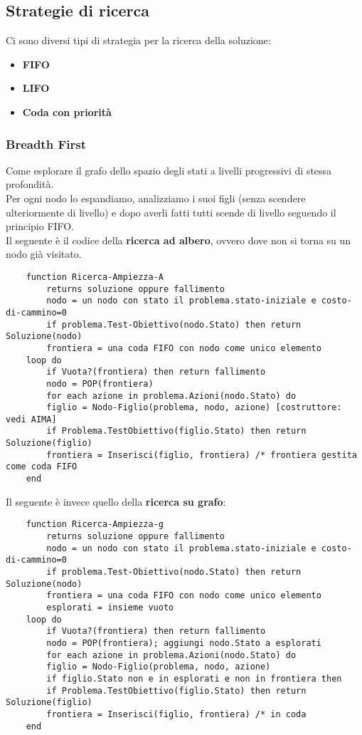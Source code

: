 \subsection{Strategie di ricerca}
Ci sono diversi tipi di strategia per la ricerca della soluzione:
\begin{itemize}
	\item \textbf{FIFO}
	\item \textbf{LIFO}
	\item \textbf{Coda con priorità}
\end{itemize}


\subsubsection{Breadth First}
Come esplorare il grafo dello spazio degli stati a livelli progressivi di stessa profondità.\\
Per ogni nodo lo espandiamo, analizziamo i suoi figli (senza scendere ulteriormente di livello) e dopo averli fatti tutti scende di livello seguendo il principio FIFO.\\
Il seguente è il codice della \textbf{ricerca ad albero}, ovvero dove non si torna su un nodo già visitato.

\begin{lstlisting}
	function Ricerca-Ampiezza-A
		returns soluzione oppure fallimento
		nodo = un nodo con stato il problema.stato-iniziale e costo-di-cammino=0
		if problema.Test-Obiettivo(nodo.Stato) then return Soluzione(nodo)
		frontiera = una coda FIFO con nodo come unico elemento
	loop do
		if Vuota?(frontiera) then return fallimento
		nodo = POP(frontiera)
		for each azione in problema.Azioni(nodo.Stato) do
		figlio = Nodo-Figlio(problema, nodo, azione) [costruttore: vedi AIMA]
		if Problema.TestObiettivo(figlio.Stato) then return Soluzione(figlio)
		frontiera = Inserisci(figlio, frontiera) /* frontiera gestita come coda FIFO
	end
\end{lstlisting}

Il seguente è invece quello della \textbf{ricerca su grafo}:
\begin{lstlisting}
	function Ricerca-Ampiezza-g
		returns soluzione oppure fallimento
		nodo = un nodo con stato il problema.stato-iniziale e costo-di-cammino=0
		if problema.Test-Obiettivo(nodo.Stato) then return Soluzione(nodo)
		frontiera = una coda FIFO con nodo come unico elemento
		esplorati = insieme vuoto
	loop do
		if Vuota?(frontiera) then return fallimento
		nodo = POP(frontiera); aggiungi nodo.Stato a esplorati
		for each azione in problema.Azioni(nodo.Stato) do
		figlio = Nodo-Figlio(problema, nodo, azione)
		if figlio.Stato non e in esplorati e non in frontiera then
		if Problema.TestObiettivo(figlio.Stato) then return Soluzione(figlio)
		frontiera = Inserisci(figlio, frontiera) /* in coda
	end
\end{lstlisting}
